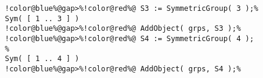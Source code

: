 \begin{Verbatim}[commandchars=!@\%,frame=single]
!color@blue%@gap>%!color@red%@ S3 := SymmetricGroup( 3 );%
Sym( [ 1 .. 3 ] ) 
!color@blue%@gap>%!color@red%@ AddObject( grps, S3 );%
!color@blue%@gap>%!color@red%@ S4 := SymmetricGroup( 4 );                                                                                                                                                                            %
Sym( [ 1 .. 4 ] ) 
!color@blue%@gap>%!color@red%@ AddObject( grps, S4 );%
\end{Verbatim}

